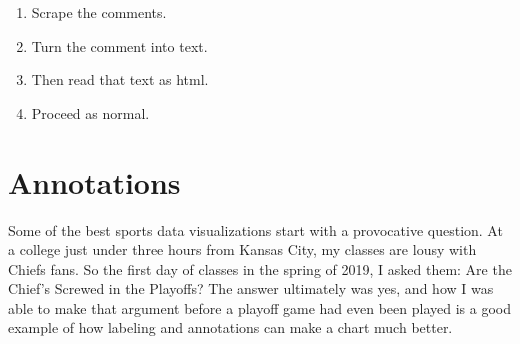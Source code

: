 \documentclass[]{book}
\newenvironment{Shaded}{\begin{snugshade}}{\end{snugshade}}
\newcommand{\CommentTok}[1]{\textcolor[rgb]{0.56,0.35,0.01}{\textit{#1}}}
\newcommand{\DataTypeTok}[1]{\textcolor[rgb]{0.13,0.29,0.53}{#1}}
\newcommand{\KeywordTok}[1]{\textcolor[rgb]{0.13,0.29,0.53}{\textbf{#1}}}
\newcommand{\NormalTok}[1]{#1}
\newcommand{\OperatorTok}[1]{\textcolor[rgb]{0.81,0.36,0.00}{\textbf{#1}}}
\newcommand{\StringTok}[1]{\textcolor[rgb]{0.31,0.60,0.02}{#1}}
\providecommand{\tightlist}{%
  \setlength{\itemsep}{0pt}\setlength{\parskip}{0pt}}
\begin{document}
\begin{enumerate}
\def\labelenumi{\arabic{enumi}.}
\tightlist
\item
  Scrape the comments.
\item
  Turn the comment into text.
\item
  Then read that text as html.
\item
  Proceed as normal.
\end{enumerate}

\begin{Shaded}
\end{Shaded}

\hypertarget{annotations}{%
\chapter{Annotations}\label{annotations}}

Some of the best sports data visualizations start with a provocative question. At a college just under three hours from Kansas City, my classes are lousy with Chiefs fans. So the first day of classes in the spring of 2019, I asked them: Are the Chief's Screwed in the Playoffs? The answer ultimately was yes, and how I was able to make that argument before a playoff game had even been played is a good example of how labeling and annotations can make a chart much better.
\end{document}
